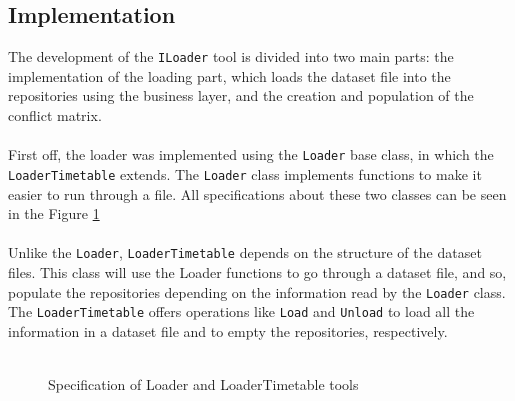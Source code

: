 \subsection{Implementation}

The development of the \verb+ILoader+ tool is divided into two main parts: the implementation of the loading part, which loads the dataset file into the repositories using the business layer, and the creation and population of the conflict matrix.\\
\\
First off, the loader was implemented using the \verb+Loader+ base class, in which the \verb+LoaderTimetable+ extends. The \verb+Loader+ class implements functions to make it easier to run through a file. All specifications about these two classes can be seen in the Figure \ref{fig:Loaders}\\
\\
Unlike the \verb+Loader+, \verb+LoaderTimetable+ depends on the structure of the dataset files. This class will use the Loader functions to go through a dataset file, and so, populate the repositories depending on the information read by the \verb+Loader+ class. The \verb+LoaderTimetable+ offers operations like \verb+Load+ and \verb+Unload+ to load all the information in a dataset file and to empty the repositories, respectively.\\
\\
\begin{figure}[t!]
\centering
{}

\caption{Specification of Loader and LoaderTimetable tools} \label{fig:Loaders}
\end{figure}
